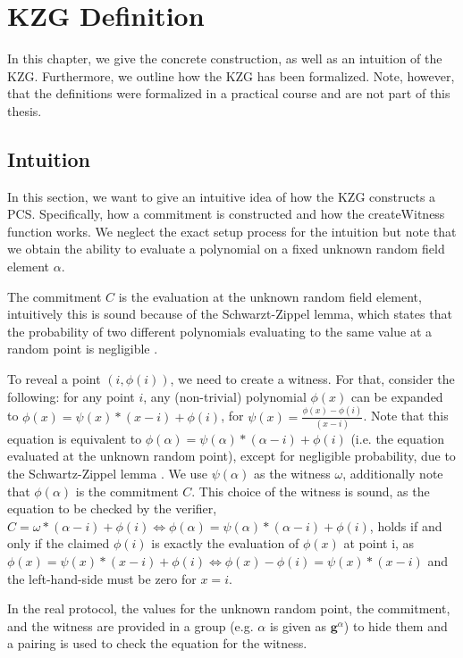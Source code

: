 \chapter{KZG Definition}\label{chapter:defs}
In this chapter, we give the concrete construction, as well as an intuition of the KZG.
Furthermore, we outline how the KZG has been formalized. Note, however, that the definitions were formalized in a practical course and are not part of this thesis. 

\section*{Intuition}
In this section, we want to give an intuitive idea of how the KZG constructs a PCS. Specifically, how a commitment is constructed and how the createWitness function works. 
We neglect the exact setup process for the intuition but note that we obtain the ability to evaluate a polynomial on a fixed unknown random field element $\alpha$.

The commitment $C$ is the evaluation at the unknown random field element, intuitively this is sound because of the Schwarzt-Zippel lemma, which states that the probability of two different polynomials evaluating to the same value at a random point is negligible \parencite{thalerbook}.

To reveal a point $(i, \phi(i))$, we need to create a witness. For that, consider the following:
for any point $i$, any (non-trivial) polynomial $\phi(x)$ can be expanded to $\phi(x)=\psi(x)*(x-i) + \phi(i)$, for $\psi(x) = \frac{\phi(x)-\phi(i)}{(x-i)}$. Note that this equation is equivalent to $\phi(\alpha)=\psi(\alpha)*(\alpha-i) + \phi(i)$ (i.e. the equation evaluated at the unknown random point), except for negligible probability, due to the Schwartz-Zippel lemma \parencite{thalerbook}. We use $\psi(\alpha)$ as the witness $\omega$, additionally note that $\phi(\alpha)$ is the commitment $C$. 
This choice of the witness is sound, as the equation to be checked by the verifier,
$C=\omega*(\alpha-i) + \phi(i) \iff \phi(\alpha)=\psi(\alpha)*(\alpha-i) + \phi(i)$, holds if and only if the claimed $\phi(i)$ is exactly the evaluation of $\phi(x)$ at point i, as $\phi(x)=\psi(x)*(x-i) + \phi(i) \iff 
\phi(x)-\phi(i)=\psi(x)*(x-i)$ and the left-hand-side must be zero for $x=i$.

In the real protocol, the values for the unknown random point, the commitment, and the witness are provided in a group (e.g. $\alpha$ is given as $\mathbf{g}^\alpha$) to hide them and a pairing is used to check the equation for the witness.

